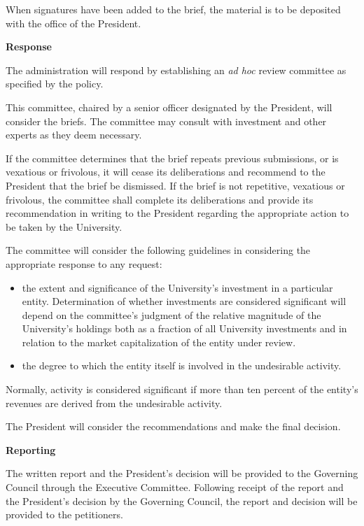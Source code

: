 \documentclass[10pt]{article}
\begin{document}
 

When signatures have been added to the brief, the material is to be deposited with the office of the President.

 

\textbf{Response}

 

The administration will respond by establishing an \emph{ad hoc} review committee as specified by the policy.

 

This committee, chaired by a senior officer designated by the President, will consider the briefs. The committee may consult with investment and other experts as they deem necessary.

 

If the committee determines that the brief repeats previous submissions, or is vexatious or frivolous, it will cease its deliberations and recommend to the President that the brief be dismissed. If the brief is not repetitive, vexatious or frivolous, the committee shall complete its deliberations and provide its recommendation in writing to the President regarding the appropriate action to be taken by the University.

 

The committee will consider the following guidelines in considering the appropriate response to any request:
\begin{itemize}
 	\item the extent and significance of the University's investment in a particular entity.  Determination of whether investments are considered significant will depend on the committee’s judgment of the relative magnitude of the University’s holdings both as a fraction of all University investments and in relation to the market capitalization of the entity under review.
	\item the degree to which the entity itself is involved in the undesirable activity.
\end{itemize}
Normally, activity is considered significant if more than ten percent of the entity's revenues are derived from the undesirable activity.

 

The President will consider the recommendations and make the final decision.

 

\textbf{Reporting}

 

The written report and the President's decision will be provided to the Governing Council through the Executive Committee. Following receipt of the report and the President’s decision by the Governing Council, the report and decision will be provided to the petitioners.
\end{document}
